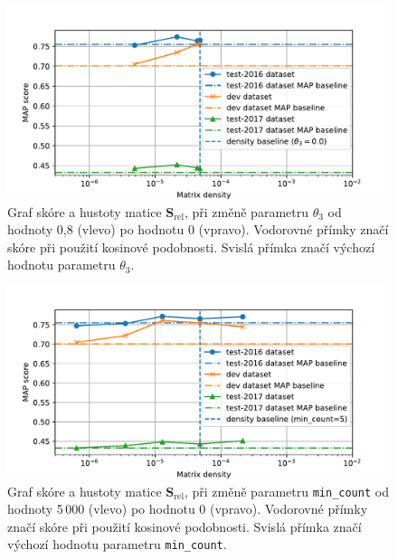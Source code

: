 \documentclass[aspectratio=169,t]{beamer}
\let\abbr\relax
\begin{document}
\begin{frame}[c]
\begin{figure}
\vfill
\begin{center}
\includegraphics[scale=0.65]{figs/fig3}
\caption{Graf \abbr{MAP} skóre a hustoty matice $\mathbf S_{\text{rel}}$, \alert{při
  změně parametru $\theta_3$} od hodnoty 0,8 (vlevo) po hodnotu 0 (vpravo).
  Vodorovné přímky značí \abbr{MAP} skóre při použití kosinové podobnosti.
  Svislá přímka značí výchozí hodnotu parametru $\theta_3$.}
\end{center}
\end{figure}
\end{frame}


\begin{frame}[c]
\begin{figure}
\vfill
\begin{center}
\includegraphics[scale=0.65]{figs/fig1}
\end{center}
\caption{Graf \abbr{MAP} skóre a hustoty matice $\mathbf S_{\text{rel}}$, \alert{při
  změně parametru \texttt{min\_count}} od hodnoty 5\,000 (vlevo) po hodnotu 0 (vpravo).
  Vodorovné přímky značí \abbr{MAP} skóre při použití kosinové podobnosti.
  Svislá přímka značí výchozí hodnotu parametru \texttt{min\_count}.}
\end{figure}
\end{frame}
\end{document}
